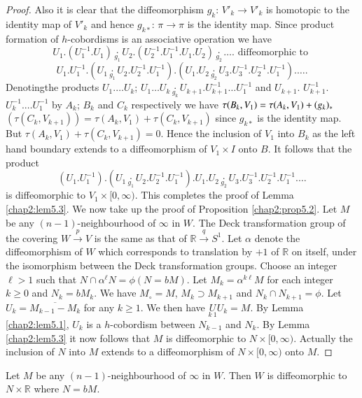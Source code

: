 \begin{proof}
Also it is clear that the diffeomorphism $g_k$: $V'_k \to V'_k$ is
homotopic to the identity map of $V'_k$ and hence $g_{k*}$: $\pi \to
\pi$ is the identity map. Since product formation of $h$-cobordisms is
an associative operation we have  
$$
U_1. (U_1^{-1}. U_1) \underset{g_1}{\cdot} U_2. (U_2 ^{-1}. U_1
^{-1}. U_1. U_2) \underset{g_2}{\cdot} \ldots .\text{ diffeomorphic to } 
$$ 
$$
U_1. U_1^{-1}. (U_1 \underset{g_1}{\cdot} U_2. U_2 ^{-1}. U_1 ^{-1}). (U_1. U_2
\underset{g_2}{\cdot} U_3. U_3^{-1}. U_2 ^{-1}. U_1^{-1}). \ldots . 
$$
Denoting\pageoriginale the products $U_1. \ldots U_k$; $U_1 \ldots U_k
\underset{g_k}{\cdot}  U_{k+1}. U_{k+1}^{-1} \ldots U_1^{-1}$ and
$U_{k+1}$. $U_{k+1}^{-1}$. $U_k^{-1}. \ldots U_1 ^{-1}$ by $A_k$;
$B_k$ and $C_k$ respectively we have $\tau (B_k,\break V_1) = \tau (A_k,
V_1)+(g_k)_*$ $(\tau (C_k, V_{k+1}))= \tau (A_k, V_1) + \tau (C_k,
V_{k+1})$ since $g_{k*}$ is the identity map. But $\tau (A_k, V_1)+
\tau (C_k, V_{k+1}) = 0$. Hence the inclusion of $V_1$ into $B_k$ as
the left hand boundary extends to a diffeomorphism of $V_1 \times I$
onto $B$. It follows that the product 
$$
(U_1. U_1 ^{-1}). (U_1
\underset{g_1}{\cdot} U_2. U_2^{-1}. U_1 ^{-1}). U_1. U_2 \underset{g_2}{\cdot}
U_3. U_3^{-1}. U_2^{-1}. U_1 ^{-1}. \ldots
$$
 is diffeomorphic to $V_1\times [0, \infty)$. This completes the proof
   of Lemma \ref{chap2:lem5.3}. We now  take up the proof of
   Proposition \ref{chap2:prop5.2}. Let 
   $M$ be any  $(n-1)$-neighbourhood of $\infty$ in $W$. The Deck
   transformation  group of the covering $W \xrightarrow{p} V$ is the
   same as that of $\mathbb{R} \xrightarrow{q}S^1$. Let $\alpha$ denote the
  diffeomorphism of $W$ which corresponds to translation by $+1$ of
  $\mathbb{R}$ on itself, under the isomorphism between the Deck
  transformation groups. Choose an integer $\ell >1$ such that $N \cap
  \alpha^\ell N= \phi (N= bM)$. Let $M_k = \alpha^{k \ell} M$ for each
  integer $k \geq 0$ and $N_k = bM_k$. We have $M_\circ = M$, $M_k \supset
  M_{k+1}$ and $N_k \cap N_{k+1}= \phi$. Let $U_k= \overline{M_{k-1}-
    M_k}$ for any $k\geq1 $. We then have $\underset{k~1}{U} U_k
  =M$. By Lemma \ref{chap2:lem5.1}, $U_k$ is a $h$-cobordism between $N_{k-1}$ and
  $N_k$. By Lemma \ref{chap2:lem5.3} it now follows that $M$ is diffeomorphic to
  $N \times [ 0, \infty)$. Actually the inclusion of $N$ into $M$
    extends to a diffeomorphism of $ N \times [ 0, \infty)$ onto $M$. 
\end{proof}

\setcounter{theorem}{3}
\begin{theorem}\label{chap2:thm5.4} %
Let $M$ be any $(n-1)$-neighbourhood of $\infty$ in $W$. Then $W$ is
diffeomorphic to $N \times \mathbb{R}$ where $N = bM$. 
\end{theorem}

